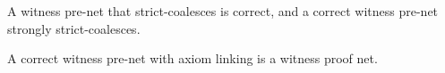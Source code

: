 \documentclass[UKenglish]{lipics-v2019}
\newcommand\+{+}
\renewcommand\*{\times}
\newcommand\dep{\preccurlyeq}
\newcommand\seq[2]{{\vdash}#1,#2}
\newcommand\net[3]{#1\triangleright #2,#3}
\newcommand\link[3][\sigma]{(#2,#3)_{#1}}
\begin{document}


\begin{theorem}
\label{thm:correctness}
\label{cor:strong coalescence}
A witness pre-net that strict-coalesces is correct, and a correct witness pre-net strongly strict-coalesces. 
\end{theorem}

%


\begin{corollary}
A correct witness pre-net with axiom linking is a witness proof net.
\end{corollary}

\end{document}
